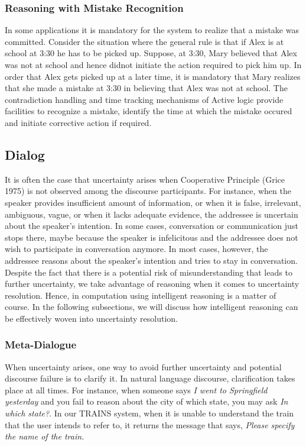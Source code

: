 \documentclass{article}
\begin{document}
\subsubsection{Reasoning with Mistake Recognition}
In some applications it is mandatory for the system to realize that a
		     mistake was committed. Consider the situation where the general rule is that if Alex
		     is at school at 3:30 he has to be picked
		     up. Suppose, at 3:30, Mary believed that Alex was not at
		school and hence didnot initiate the action required
		to pick him up. In order that Alex gets picked up at a
		     later time, it is mandatory that Mary realizes
		     that she made a mistake at 3:30 in believing that
		     Alex was not at school. 
The contradiction handling and time tracking mechanisms of Active logic provide
		     facilities to recognize a mistake, identify the
		     time at which the mistake occured and initiate
		     corrective action if required.





\subsection{Dialog}
	It is often the case that uncertainty arises when Cooperative
	Principle (Grice 1975) is not observed among the discourse
	participants.  For instance, when the speaker provides
	insufficient amount of information, or when it is false,
	irrelevant, ambiguous, vague, or when it lacks adequate
	evidence, the addressee is uncertain about the speaker's
	intention.  In some cases, conversation or communication just
	stops there, maybe because the speaker is infelicitous and the
	addressee does not wish to participate in conversation
	anymore.  In most cases, however, the addressee reasons about
	the speaker's intention and tries to stay in conversation.
	Despite the fact that there is a potential risk of
	misunderstanding that leads to further uncertainty, we take advantage of reasoning when it comes to uncertainty resolution.
	Hence, in computation using intelligent reasoning is a matter
	of course.  In the following subsections, we will discuss how
	intelligent reasoning can be effectively woven into
	uncertainty resolution.


\subsubsection{Meta-Dialogue}
When uncertainty arises, one way to avoid further uncertainty and
potential discourse failure is to clarify it.  In natural language
discourse, clarification takes place at all times.  For instance, when
someone says {\em I went to Springfield yesterday} and you fail to reason about the city of which state, you may ask {\em In which state?}.
In our TRAINS system, when it is unable to understand the train that
the user intends to refer to, it returns the message that says, {\em Please specify the name of the train.}
\end{document}
